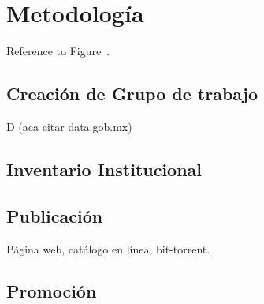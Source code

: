 \documentclass[
10pt, %
letterpaper, %
oneside, %
headinclude,footinclude, %
BCOR5mm, %
]{scrartcl}
\begin{document}
\section{Metodología}
Reference to Figure~. %


\subsection{Creación de Grupo de trabajo}
D
(aca citar data.gob.mx)

\subsection{Inventario Institucional}
\cite{_nih_????}

\subsection{Publicación}
Página web, catálogo en línea, bit-torrent.

\subsection{Promoción}
\cite{schofield_post-publication_2009}



\renewcommand{\refname}{\spacedlowsmallcaps{References}} %



%


\end{document}
